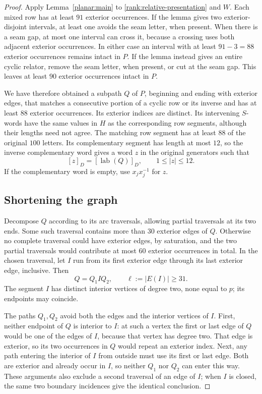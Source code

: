 \begin{proof}
Apply Lemma~\ref{planar:main} to
\eqref{rank:relative-presentation} and $W$.  Each mixed row has at
least $91$ exterior occurrences.  If the lemma gives two
exterior-disjoint intervals, at least one avoids the seam letter,
when present.  When there is a seam gap, at most one interval can
cross it, because a crossing uses both adjacent exterior occurrences.
In either case an interval with at least $91-3=88$ exterior
occurrences remains intact in $P$.  If the lemma instead gives an
entire cyclic relator, remove the seam letter, when present, or cut at
the seam gap.  This leaves at least $90$ exterior occurrences intact
in $P$.

We have therefore obtained a subpath $Q$ of $P$, beginning and ending
with exterior edges, that matches a consecutive portion of a cyclic
row or its inverse and has at least $88$ exterior occurrences.
Its exterior indices are distinct.  Its intervening $S$-words have
the same values in $H$ as the corresponding row segments, although
their lengths need not agree.  The matching row segment has at least
$88$ of the original $100$ letters.  Its complementary segment has
length at most $12$, so the inverse complementary word gives a word
$z$ in the original generators such that
\begin{equation}\label{rank:short-word}
 [z]_D=[\operatorname{lab}(Q)]_D,
 \qquad 1\le |z|\le12.
\end{equation}
If the complementary word is empty, use $x_jx_j^{-1}$ for $z$.

\subsection*{Shortening the graph}
Decompose $Q$ according to its arc traversals, allowing partial
traversals at its two ends.  Some such traversal contains more than
$30$ exterior edges of $Q$.  Otherwise no complete traversal could
have exterior edges, by saturation, and the two partial traversals
would contribute at most $60$ exterior occurrences in total.
In the chosen traversal, let $I$ run from its first exterior edge
through its last exterior edge, inclusive.  Then
\[
 Q=Q_1 I Q_2,\qquad \ell:=|E(I)|\ge31.
\]
The segment $I$ has distinct interior vertices of degree two, none
equal to $p$; its endpoints may coincide.

The paths $Q_1,Q_2$ avoid both the edges and the interior vertices of
$I$.  First, neither endpoint of $Q$ is interior to $I$: at such a
vertex the first or last edge of $Q$ would be one of the edges of $I$,
because that vertex has degree two.  That edge is exterior, so its
two occurrences in $Q$ would repeat an exterior index.  Next, any
path entering the interior of $I$ from outside must use its first
or last edge.  Both are exterior and already occur in $I$, so neither
$Q_1$ nor $Q_2$ can enter this way.  These arguments also exclude a
second traversal of an edge of $I$; when $I$ is closed, the same two
boundary incidences give the identical conclusion.


\end{proof}
